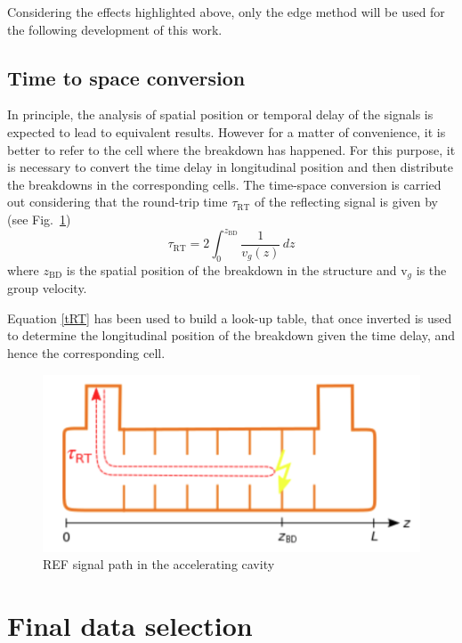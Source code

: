 \noindent
Considering the effects highlighted above, only the edge method will be used for the following development of this work.



\subsection[Time to space conversion]{Time to space conversion}

In principle, the analysis of spatial position or temporal delay of the signals is expected to lead to equivalent results. However for a matter of convenience, it is better to refer to the cell where the breakdown has happened. For this purpose, it is necessary to convert the time delay in longitudinal position and then distribute the breakdowns in the corresponding cells. The time-space conversion is carried out considering that the round-trip time $\tau_{\text{RT}}$  of the reflecting signal is given by (see Fig.~\ref{tToz_p})
\begin{equation}
\tau_{\text{RT}} = 2 \int_0^{z_{\text{BD}}} \frac{1}{v_g (z)} \, dz
\label{tRT}
\end{equation}
where $z_{\text{BD}}$ is the spatial position of the breakdown in the structure and v$_g$ is the group velocity.

Equation \ref{tRT} has been used to build a look-up table, that once inverted is used to determine the longitudinal position of the breakdown given the time delay, and hence the corresponding cell.


\begin{figure}[h]
\centering 
\includegraphics[scale=0.3]{pictures/tToz}
\caption{REF signal path in the accelerating cavity}
\label{tToz_p}
\end{figure}




\section[Final data selection]{Final data selection}
\label{sec:BDR}

